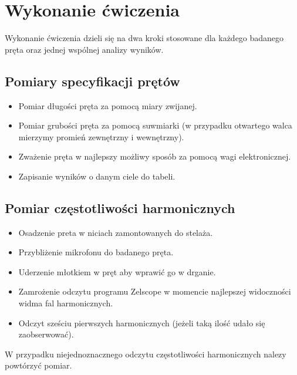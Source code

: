 \documentclass[a4paper,12pts]{article}
\begin{document}

\section{Wykonanie ćwiczenia}
Wykonanie ćwiczenia dzieli się na dwa kroki stosowane dla każdego badanego pręta oraz jednej wspólnej analizy wyników.
\subsection{Pomiary specyfikacji prętów}
\begin{itemize}
	\item Pomiar długości pręta za pomocą miary zwijanej.
	\item Pomiar grubości pręta za pomocą suwmiarki (w przypadku otwartego walca mierzymy promień zewnętrzny i wewnętrzny).
	\item Zważenie pręta w najlepszy możliwy sposób za pomocą wagi elektronicznej.
	\item Zapisanie wyników o danym ciele do tabeli.
\end{itemize}
\newpage
\subsection{Pomiar częstotliwości harmonicznych}
\begin{itemize}
	\item Osadzenie preta w niciach zamontowanych do stelaża.
	\item Przybliżenie mikrofonu do badanego pręta.
	\item Uderzenie młotkiem w pręt aby wprawić go w drganie.
	\item Zamrożenie odczytu programu Zelscope w momencie najlepszej widoczności widma fal harmonicznych.
	\item Odczyt sześciu pierwszych harmonicznych (jeżeli taką ilość udało się zaobserwować).
\end{itemize}
W przypadku niejednoznacznego odczytu częstotliwości harmonicznych nalezy powtórzyć pomiar.
\end{document}
